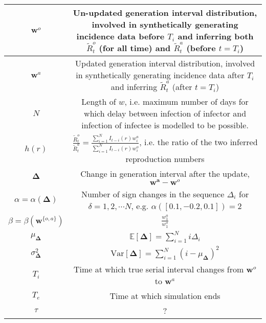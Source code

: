 \documentclass[10pt,journal,compsoc]{IEEEtran}
\begin{document}
\begin{table}[htbp]
\begin{tabular}{|c||c|}
$\boldsymbol{w}^o$ & \makecell{Un-updated generation interval distribution, \\ involved in synthetically generating incidence \\ data before $T_i$ and inferring both $\tilde{R}_t^o$ \\ (for all time) and $\tilde{R}_t^a$ (before $t=T_i$)}\\ \hline

$\boldsymbol{w}^a$ & \makecell{Updated generation interval \\ distribution, involved in synthetically \\ generating incidence data after \\ $T_i$ and inferring $\tilde{R}_t^a$ (after $t=T_i$)}\\ \hline

$N$ & \makecell{Length of $w$, i.e. maximum number of days \\ for which delay between infection of \\ infector and infection of infectee \\ is modelled to be possible.} \\ \hline

$h(r)$ & \makecell{$\frac{\tilde{R}_t^o}{\tilde{R}_t^a} = \frac{\sum_{i=1}^{N}I_{t-i}(r)w_i^a}{\sum_{i=1}^{N}I_{t-i}(r)w_i^o}$, i.e. the ratio \\ of the two inferred reproduction numbers} \\ \hline

$\boldsymbol{\Delta}$ & \makecell{Change in generation interval after \\ the update, $\boldsymbol{w^a}-\boldsymbol{w}^o$} \\ \hline

$\alpha = \alpha(\boldsymbol{\Delta})$ & \makecell{Number of sign changes in the sequence $\Delta_i$ \\ for $\delta=1, 2, \cdots N$, e.g. $\alpha([0.1, -0.2, 0.1])=2$} \\ \hline

$\beta = \beta(\boldsymbol{w}^{\{o, a\}})$ & $\frac{w_1^a}{w_1^o}$ \\ \hline

$\mu_{\boldsymbol{\Delta}}$ & $\mathbb{E}[\boldsymbol{\Delta}] = \sum_{i=1}^Ni\Delta_i$ \\ \hline

$\sigma^2_{\boldsymbol{\Delta}}$ & $\mathrm{Var}[\boldsymbol{\Delta}] = \sum_{i=1}^N(i-\mu_{\boldsymbol{\Delta}})^2$ \\ \hline

$T_i$ & \makecell{Time at which true serial interval changes \\ from $\boldsymbol{w}^o$ to $\boldsymbol{w}^a$} \\ \hline

$T_e$ & Time at which simulation ends \\ \hline
 $\tau$ & ? \\\hline\hline
\end{tabular}
\caption{}
\label{table:table_1}
\end{table}
\end{document}
